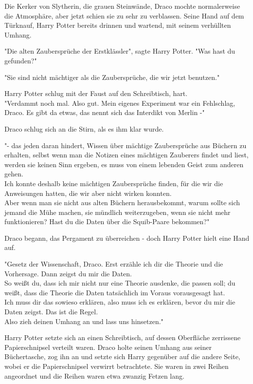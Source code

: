 {Die Kerker von Slytherin, die grauen Steinwände, Draco mochte normalerweise die Atmosphäre, aber jetzt schien sie zu sehr zu verblassen. Seine Hand auf dem Türknauf, Harry Potter bereits drinnen und wartend, mit seinem verhüllten Umhang.

"Die alten Zaubersprüche der Erstklässler", sagte Harry Potter. "Was hast du gefunden?"

"Sie sind nicht mächtiger als die Zaubersprüche, die wir jetzt benutzen."

Harry Potter schlug mit der Faust auf den Schreibtisch, hart.\\ "Verdammt noch mal. Also gut. Mein eigenes Experiment war ein Fehlschlag, Draco. Es gibt da etwas, das nennt sich das Interdikt von Merlin -"

Draco schlug sich an die Stirn, als es ihm klar wurde.

"- das jeden daran hindert, Wissen über mächtige Zaubersprüche aus Büchern zu erhalten, selbst wenn man die Notizen eines mächtigen Zauberers findet und liest, werden sie keinen Sinn ergeben, es muss von einem lebenden Geist zum anderen gehen.\\ Ich konnte deshalb keine mächtigen Zaubersprüche finden, für die wir die Anweisungen hatten, die wir aber nicht wirken konnten.\\ Aber wenn man sie nicht aus alten Büchern herausbekommt, warum sollte sich jemand die Mühe machen, sie mündlich weiterzugeben, wenn sie nicht mehr funktionieren? Hast du die Daten über die Squib-Paare bekommen?"

Draco begann, das Pergament zu überreichen - doch Harry Potter hielt eine Hand auf.

"Gesetz der Wissenschaft, Draco. Erst erzähle ich dir die Theorie und die Vorhersage. Dann zeigst du mir die Daten.\\ So weißt du, dass ich mir nicht nur eine Theorie ausdenke, die passen soll; du weißt, dass die Theorie die Daten tatsächlich im Voraus vorausgesagt hat.\\ Ich muss dir das sowieso erklären, also muss ich es erklären, bevor du mir die Daten zeigst. Das ist die Regel.\\ Also zieh deinen Umhang an und lass uns hinsetzen."

Harry Potter setzte sich an einen Schreibtisch, auf dessen Oberfläche zerrissene Papierschnipsel verteilt waren. Draco holte seinen Umhang aus seiner Büchertasche, zog ihn an und setzte sich Harry gegenüber auf die andere Seite, wobei er die Papierschnipsel verwirrt betrachtete. Sie waren in zwei Reihen angeordnet und die Reihen waren etwa zwanzig Fetzen lang.

}

